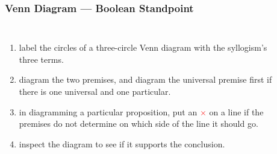 \documentclass[UTF8,aspectratio=43,11pt,colorlinks,compress,openany]{beamer}%
\begin{document}
\begin{frame}\frametitle{Venn Diagram --- Boolean Standpoint}
		\begin{columns}
				\begin{enumerate}
					\item label the circles of a three-circle Venn diagram with the syllogism's three terms.
					\item diagram the two premises, and diagram the universal premise first if there is one universal and one particular.
					\item in diagramming a particular proposition, put an \textcolor{red}{$\times$} on a line if the premises do not determine on which side of the line it should go.
					\item inspect the diagram to see if it supports the conclusion.
				\end{enumerate}
				\begin{prooftree}
					\noLine
					\alwaysSingleLine
				\end{prooftree}
				\begin{center}
				\end{center}
		\end{columns}
\end{frame}
\end{document}
